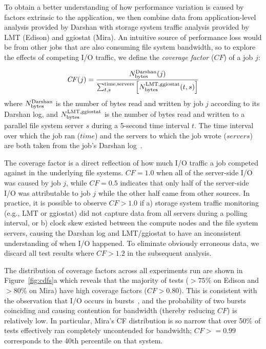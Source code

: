 To obtain a better understanding of how performance variation is caused by factors extrinsic to the application, we then combine data from application-level analysis provided by Darshan with storage system traffic analysis provided by LMT (Edison) and ggiostat (Mira).
An intuitive source of performance loss would be from other jobs that are also consuming file system bandwidth, so to explore the effects of competing I/O traffic, we define the \emph{coverage factor} ($\mathit{CF}$) of a job $j$:

\begin{equation} \label{eq:cf}
    \mathit{CF}(j) = \frac{N_{\textup{bytes}}^{\textup{Darshan}}(j)}
    {\sum_{t,s}^{\textup{time,servers}}
    \left [ N_{\textup{bytes}}^{\textup{LMT,ggiostat}}(t,s) \right ] }
\end{equation}
%
where $N_{\textup{bytes}}^{\textup{Darshan}}$ is the number of bytes read and written by job $j$ according to its Darshan log, and $N_{\textup{bytes}}^{\textup{LMT,ggiostat}}$ is the number of bytes read and written to a parallel file system server $s$ during a 5-second time interval $t$.
The time interval over which the job ran ($\mathit{time}$) and the servers to which the job wrote ($\mathit{servers}$) are both taken from the job's Darshan log~\cite{snyder2016modular}.

The coverage factor is a direct reflection of how much I/O traffic a job competed against in the underlying file systems.
$CF = 1.0$ when all of the server-side I/O was caused by job $j$, while $CF = 0.5$ indicates that only half of the server-side I/O was attributable to job $j$ while the other half came from other sources.
In practice, it is possible to observe $CF > 1.0$ if
a) storage system traffic monitoring (e.g., LMT or ggiostat) did not capture data from all servers during a polling interval, or
b) clock skew existed between the compute nodes and the file system servers, causing the Darshan log and LMT/ggiostat to have an inconsistent understanding of when I/O happened.
To eliminate obviously erroneous data, we discard all test results where $CF > 1.2$ in the subsequent analysis.

The distribution of coverage factors across all experiments run are shown in Figure~\ref{fig:cdfs}a which reveals that the majority of tests ($> 75\%$ on Edison and $> 80\%$ on Mira) have high coverage factors ($\mathit{CF} > 0.80$).
This is consistent with the observation that I/O occurs in bursts~\cite{Carns2011,Liu2016}, and the probability of two bursts coinciding and causing contention for bandwidth (thereby reducing $\mathit{CF}$) is relatively low.
In particular, Mira's CF distribution is so narrow that over 50\% of tests effectively ran completely uncontended for bandwidth; $\mathit{CF} >= 0.99$ corresponds to the 40th percentile on that system.

